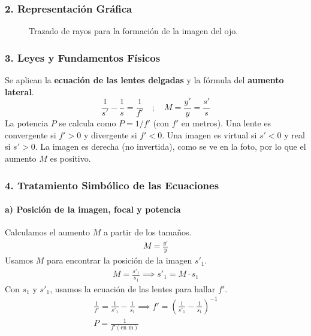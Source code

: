 \subsubsection*{2. Representación Gráfica}
\begin{figure}[H]
    \centering
    \caption{Trazado de rayos para la formación de la imagen del ojo.}
\end{figure}

\subsubsection*{3. Leyes y Fundamentos Físicos}
Se aplican la \textbf{ecuación de las lentes delgadas} y la fórmula del \textbf{aumento lateral}.
$$ \frac{1}{s'} - \frac{1}{s} = \frac{1}{f'} \quad ; \quad M = \frac{y'}{y} = \frac{s'}{s} $$
La potencia $P$ se calcula como $P = 1/f'$ (con $f'$ en metros).
Una lente es convergente si $f' > 0$ y divergente si $f' < 0$. Una imagen es virtual si $s' < 0$ y real si $s' > 0$. La imagen es derecha (no invertida), como se ve en la foto, por lo que el aumento $M$ es positivo.

\subsubsection*{4. Tratamiento Simbólico de las Ecuaciones}
\paragraph*{a) Posición de la imagen, focal y potencia}
Calculamos el aumento $M$ a partir de los tamaños.
\begin{gather}
    M = \frac{y'}{y}
\end{gather}
Usamos $M$ para encontrar la posición de la imagen $s'_1$.
\begin{gather}
    M = \frac{s'_1}{s_1} \implies s'_1 = M \cdot s_1
\end{gather}
Con $s_1$ y $s'_1$, usamos la ecuación de las lentes para hallar $f'$.
\begin{gather}
    \frac{1}{f'} = \frac{1}{s'_1} - \frac{1}{s_1} \implies f' = \left( \frac{1}{s'_1} - \frac{1}{s_1} \right)^{-1} \\
    P = \frac{1}{f' (\text{en m})}
\end{gather}
